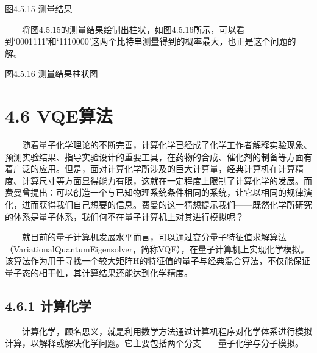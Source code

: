 \documentclass[a4paper,11pt,english]{sphinxmanual}
\begin{document}

\begin{center}图4.5.15 测量结果
\end{center}
\sphinxAtStartPar
  将图4.5.15的测量结果绘制出柱状，如图4.5.16所示，可以看到‘0001111’和‘1110000’这两个比特串测量得到的概率最大，也正是这个问题的解。


\begin{center}图4.5.16 测量结果柱状图
\end{center}
\sphinxstepscope


\section{4.6 VQE算法}
\label{\detokenize{rst/4.6VQE_u7b97_u6cd5:vqe}}\label{\detokenize{rst/4.6VQE_u7b97_u6cd5::doc}}
\sphinxAtStartPar
  随着量子化学理论的不断完善，计算化学已经成了化学工作者解释实验现象、预测实验结果、指导实验设计的重要工具，在药物的合成、催化剂的制备等方面有着广泛的应用。但是，面对计算化学所涉及的巨大计算量，经典计算机在计算精度、计算尺寸等方面显得能力有限，这就在一定程度上限制了计算化学的发展。而费曼曾提出：可以创造一个与已知物理系统条件相同的系统，让它以相同的规律演化，进而获得我们自己想要的信息。费曼的这一猜想提示我们——既然化学所研究的体系是量子体系，我们何不在量子计算机上对其进行模拟呢？

\sphinxAtStartPar
  就目前的量子计算机发展水平而言，可以通过变分量子特征值求解算法（Variational\sphinxhyphen{}Quantum\sphinxhyphen{}Eigensolver，简称VQE），在量子计算机上实现化学模拟。该算法作为用于寻找一个较大矩阵H的特征值的量子与经典混合算法，不仅能保证量子态的相干性，其计算结果还能达到化学精度。


\subsection{4.6.1 计算化学}
\label{\detokenize{rst/4.6VQE_u7b97_u6cd5:id1}}
\sphinxAtStartPar
{}

\sphinxAtStartPar
  计算化学，顾名思义，就是利用数学方法通过计算机程序对化学体系进行模拟计算，以解释或解决化学问题。它主要包括两个分支——量子化学与分子模拟。

\end{document}
